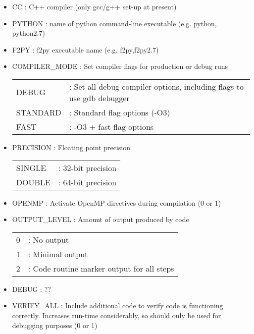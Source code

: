 \documentclass[a4paper]{article}
\begin{document}
\begin{itemize}

\item CC : C++ compiler (only gcc/g++ set-up at present)

\item PYTHON : name of python command-line executable (e.g. python, python2.7)

\item F2PY : f2py executable name (e.g. f2py,f2py2.7)

\item COMPILER\_MODE : Set compiler flags for production or debug runs \\
\begin{tabular}{ll}
DEBUG & : Set all debug compiler options, including flags to use gdb debugger \\
STANDARD & : Standard flag options (-O3) \\
FAST & : -O3 + fast flag options
\end{tabular}

\item PRECISION : Floating point precision \\
\begin{tabular}{ll}
SINGLE & : 32-bit precision \\
DOUBLE & : 64-bit precision
\end{tabular}

\item OPENMP : Activate OpenMP directives during compilation (0 or 1)

\item OUTPUT\_LEVEL : Amount of output produced by code \\
\begin{tabular}{ll}
0 & : No output \\
1 & : Minimal output \\
2 & : Code routine marker output for all steps
\end{tabular}

\item DEBUG : ?? \\

\item VERIFY\_ALL : Include additional code to verify code is functioning correctly.  Increases run-time considerably, so should only be used for debugging purposes (0 or 1)

\end{itemize}

\newpage
\end{document}

